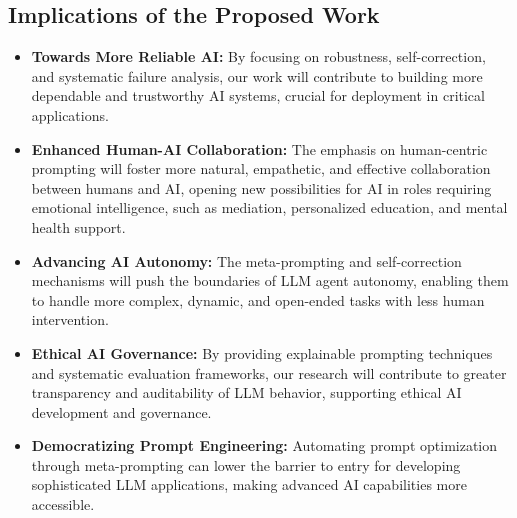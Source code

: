 \documentclass{article}
\begin{document}
\subsection{Implications of the Proposed Work}
\begin{itemize}
    \item \textbf{Towards More Reliable AI:} By focusing on robustness, self-correction, and systematic failure analysis, our work will contribute to building more dependable and trustworthy AI systems, crucial for deployment in critical applications.
    \item \textbf{Enhanced Human-AI Collaboration:} The emphasis on human-centric prompting will foster more natural, empathetic, and effective collaboration between humans and AI, opening new possibilities for AI in roles requiring emotional intelligence, such as mediation, personalized education, and mental health support.
    \item \textbf{Advancing AI Autonomy:} The meta-prompting and self-correction mechanisms will push the boundaries of LLM agent autonomy, enabling them to handle more complex, dynamic, and open-ended tasks with less human intervention.
    \item \textbf{Ethical AI Governance:} By providing explainable prompting techniques and systematic evaluation frameworks, our research will contribute to greater transparency and auditability of LLM behavior, supporting ethical AI development and governance.
    \item \textbf{Democratizing Prompt Engineering:} Automating prompt optimization through meta-prompting can lower the barrier to entry for developing sophisticated LLM applications, making advanced AI capabilities more accessible.
\end{itemize}
\end{document}
